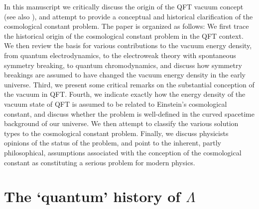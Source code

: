 \documentclass[12pt]{article}
\def\s{\section}
\begin{document}
In this manuscript we critically discuss the origin of the QFT
vacuum concept (see also \cite{rugh96,rugh98}), and attempt to
provide a conceptual and historical clarification of the
cosmological constant problem. The paper is organized as follows:
We first trace the historical origin of the cosmological constant
problem in the QFT context. We then review the basis for various
contributions to the vacuum energy density, from quantum
electrodynamics, to the electroweak theory with spontaneous
symmetry breaking, to quantum chromodynamics, and discuss how
symmetry breakings are assumed to have changed the vacuum energy
density in the early universe. Third, we present some critical
remarks on the substantial conception of the vacuum in QFT.
Fourth, we indicate exactly how the energy density of the vacuum
state of QFT is assumed to be related to Einstein's cosmological
constant, and discuss whether the problem is well-defined in the
curved spacetime background of our universe. We then attempt to
classify the various solution types to the cosmological constant
problem. Finally, we discuss physicists opinions of the status of
the problem, and point to the inherent, partly philosophical,
assumptions associated with the conception of the cosmological
constant as constituting a serious problem for modern physics.

\s{The `quantum' history of $\Lambda$} 
\end{document}
